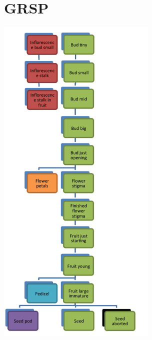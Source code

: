\documentclass[10pt]{book} %
\begin{document}
\section{GRSP}
\begin{multicols}{2}
\includegraphics[width=3in]{GRSP.png}
\vfill
\columnbreak



\end{multicols}




\clearpage
\newpage
\end{document}
